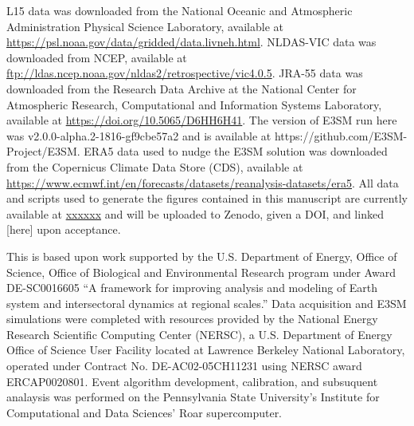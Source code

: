 \documentclass[draft]{agujournal2019}
\begin{document}
L15 data was downloaded from the National Oceanic and Atmospheric Administration Physical Science Laboratory, available at \url{https://psl.noaa.gov/data/gridded/data.livneh.html}. NLDAS-VIC data was downloaded from NCEP, available at \url{ftp://ldas.ncep.noaa.gov/nldas2/retrospective/vic4.0.5}. JRA-55 data was downloaded from the Research Data Archive at the National Center for Atmospheric Research, Computational and Information Systems Laboratory, available at \url{https://doi.org/10.5065/D6HH6H41}. The version of E3SM run here was v2.0.0-alpha.2-1816-gf9cbe57a2 and is available at https://github.com/E3SM-Project/E3SM. ERA5 data used to nudge the E3SM solution was downloaded from the Copernicus Climate Data Store (CDS), available at \url{https://www.ecmwf.int/en/forecasts/datasets/reanalysis-datasets/era5}. All data and scripts used to generate the figures contained in this manuscript are currently available at \url{xxxxxx} and will be uploaded to Zenodo, given a DOI, and linked [here] upon acceptance.



%
%
%
%
%
%
%
%


\acknowledgments
This is based upon work supported by the U.S. Department of Energy, Office of Science, Office of Biological and Environmental Research program under Award DE-SC0016605 ``A framework for improving analysis and modeling of Earth system and intersectoral dynamics at regional scales.'' Data acquisition and E3SM simulations were completed with resources provided by the National Energy Research Scientific Computing Center (NERSC), a U.S. Department of Energy Office of Science User Facility located at Lawrence Berkeley National Laboratory, operated under Contract No. DE-AC02-05CH11231 using NERSC award ERCAP0020801. Event algorithm development, calibration, and subsuquent analaysis was performed on the Pennsylvania State University's Institute for Computational and Data Sciences' Roar supercomputer.
\end{document}
